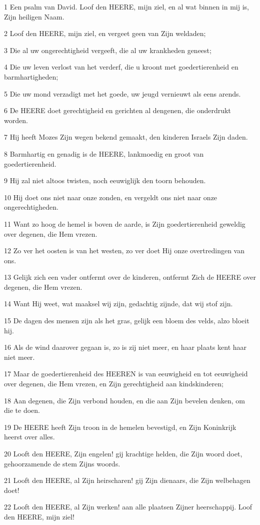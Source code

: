\par 1 Een psalm van David. Loof den HEERE, mijn ziel, en al wat binnen in mij is, Zijn heiligen Naam.
\par 2 Loof den HEERE, mijn ziel, en vergeet geen van Zijn weldaden;
\par 3 Die al uw ongerechtigheid vergeeft, die al uw krankheden geneest;
\par 4 Die uw leven verlost van het verderf, die u kroont met goedertierenheid en barmhartigheden;
\par 5 Die uw mond verzadigt met het goede, uw jeugd vernieuwt als eens arends.
\par 6 De HEERE doet gerechtigheid en gerichten al dengenen, die onderdrukt worden.
\par 7 Hij heeft Mozes Zijn wegen bekend gemaakt, den kinderen Israels Zijn daden.
\par 8 Barmhartig en genadig is de HEERE, lankmoedig en groot van goedertierenheid.
\par 9 Hij zal niet altoos twisten, noch eeuwiglijk den toorn behouden.
\par 10 Hij doet ons niet naar onze zonden, en vergeldt ons niet naar onze ongerechtigheden.
\par 11 Want zo hoog de hemel is boven de aarde, is Zijn goedertierenheid geweldig over degenen, die Hem vrezen.
\par 12 Zo ver het oosten is van het westen, zo ver doet Hij onze overtredingen van ons.
\par 13 Gelijk zich een vader ontfermt over de kinderen, ontfermt Zich de HEERE over degenen, die Hem vrezen.
\par 14 Want Hij weet, wat maaksel wij zijn, gedachtig zijnde, dat wij stof zijn.
\par 15 De dagen des mensen zijn als het gras, gelijk een bloem des velds, alzo bloeit hij.
\par 16 Als de wind daarover gegaan is, zo is zij niet meer, en haar plaats kent haar niet meer.
\par 17 Maar de goedertierenheid des HEEREN is van eeuwigheid en tot eeuwigheid over degenen, die Hem vrezen, en Zijn gerechtigheid aan kindskinderen;
\par 18 Aan degenen, die Zijn verbond houden, en die aan Zijn bevelen denken, om die te doen.
\par 19 De HEERE heeft Zijn troon in de hemelen bevestigd, en Zijn Koninkrijk heerst over alles.
\par 20 Looft den HEERE, Zijn engelen! gij krachtige helden, die Zijn woord doet, gehoorzamende de stem Zijns woords.
\par 21 Looft den HEERE, al Zijn heirscharen! gij Zijn dienaars, die Zijn welbehagen doet!
\par 22 Looft den HEERE, al Zijn werken! aan alle plaatsen Zijner heerschappij. Loof den HEERE, mijn ziel!

